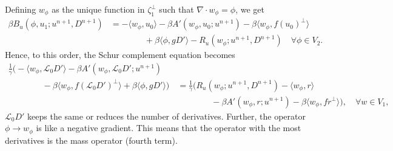 \documentclass{article}
\begin{document}
Defining $w_\phi$ as the unique function in $\zeta_1^{\perp}$ such
that $\nabla\cdot w_\phi=\phi$, we get
\begin{align}
  \nonumber
  \beta B_u(\phi, u_1; u^{n+1},D^{n+1})
  & = 
  -\langle w_{\phi}, u_0 \rangle - \beta A'(w_\phi, u_0; u^{n+1})
  - \beta\langle w_\phi, f(u_0)^{\perp}\rangle \\
  & \qquad\qquad
  + \beta\langle \phi, gD'\rangle
  -R_u(w_\phi;u^{n+1},D^{n+1})
  \quad \forall \phi \in V_2.
\end{align}
Hence, to this order, the Schur complement equation becomes
\begin{align}
  \nonumber
  \frac{1}{\gamma}\Big(-\langle w_{\phi}, \mathcal{L}_0D' \rangle 
  - \beta A'(w_\phi, \mathcal{L}_0D'; u^{n+1}) \quad & \\
  \nonumber
\qquad  \qquad   - \beta\langle w_\phi, f(\mathcal{L}_0D')^{\perp}\rangle
  + \beta\langle \phi, gD'\rangle\Big)
  &= \frac{1}{\gamma}\Big(R_u(w_\phi;u^{n+1},D^{n+1})
  -\langle w_{\phi}, r \rangle  \\
  & \qquad\qquad -\beta A'(w_\phi, r; u^{n+1})
  - \beta\langle w_\phi, fr^{\perp}\rangle\Big),
  \quad \forall w \in V_1,
\end{align}
$\mathcal{L}_0D'$ keeps the same or reduces the number of derivatives.
Further, the operator $\phi\to w_\phi$ is like a negative gradient.
This means that the operator with the most derivatives is the
mass operator (fourth term).
\end{document}

